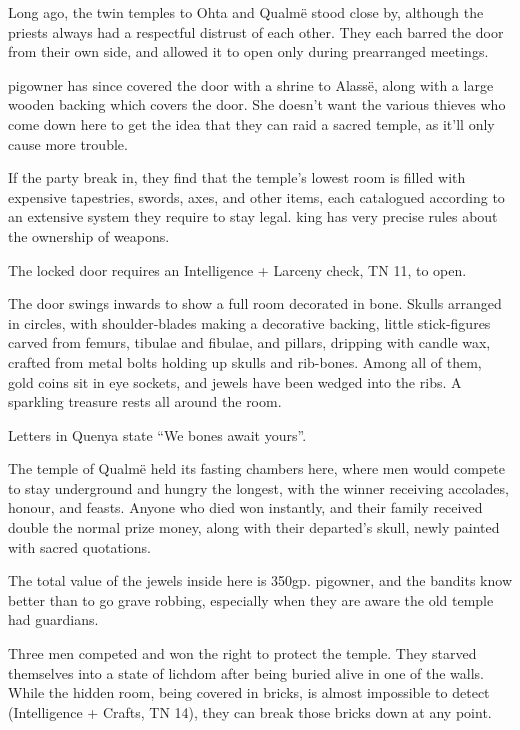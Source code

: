 \begin{multicols}{2}
Long ago, the twin temples to Ohta and Qualm\"{e} stood close by, although the priests always had a respectful distrust of each other.
They each barred the door from their own side, and allowed it to open only during prearranged meetings.

\Gls{pigowner} has since covered the door with a shrine to Alass\"{e}, along with a large wooden backing which covers the door.  She doesn't want the various thieves who come down here to get the idea that they can raid a sacred temple, as it'll only cause more trouble.

If the party break in, they find that the temple's lowest room is filled with expensive tapestries, swords, axes, and other items, each catalogued according to an extensive system they require to stay legal.  \Gls{king} has very precise rules about the ownership of weapons.

The locked door requires an Intelligence + Larceny check, TN 11, to open.

\begin{boxtext}
	The door swings inwards to show a full room decorated in bone.
	Skulls arranged in circles, with shoulder-blades making a decorative backing, little stick-figures carved from femurs, tibulae and fibulae, and pillars, dripping with candle wax, crafted from metal bolts holding up skulls and rib-bones.
	Among all of them, gold coins sit in eye sockets, and jewels have been wedged into the ribs.
	A sparkling treasure rests all around the room.

	Letters in Quenya state ``We bones await yours''.
\end{boxtext}

The temple of Qualm\"{e} held its fasting chambers here, where men would compete to stay underground and hungry the longest, with the winner receiving accolades, honour, and feasts.  Anyone who died won instantly, and their family received double the normal prize money, along with their departed's skull, newly painted with sacred quotations.

The total value of the jewels inside here is 350gp.
\Gls{pigowner}, and the bandits know better than to go grave robbing, especially when they are aware the old temple had guardians.

Three men competed and won the right to protect the temple.
They starved themselves into a state of lichdom after being buried alive in one of the walls.
While the hidden room, being covered in bricks, is almost impossible to detect (Intelligence + Crafts, TN 14), they can break those bricks down at any point.


\end{multicols}
